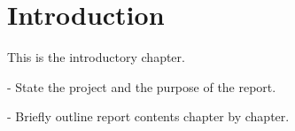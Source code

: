 \chapter{Introduction}

This is the introductory chapter.

- State the project and the purpose of the report.

- Briefly outline report contents chapter by chapter.
